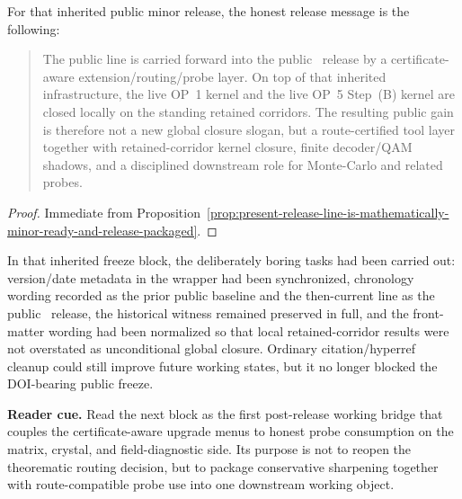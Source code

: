 \begin{corollary}
\label{cor:honest-public-release-message-for-the-present-minor-release}
For that inherited public minor release, the honest release message is the following:
\begin{quote}\small
The public  line is carried forward into the public \docversion\ release by a certificate-aware extension/routing/probe layer. On top of that inherited infrastructure, the live OP~1 kernel and the live OP~5 Step~(B) kernel are closed locally on the standing retained corridors. The resulting public gain is therefore not a new global closure slogan, but a route-certified tool layer together with retained-corridor kernel closure, finite decoder/QAM shadows, and a disciplined downstream role for Monte-Carlo and related probes.
\end{quote}
\end{corollary}

\begin{proof}
Immediate from Proposition~\ref{prop:present-release-line-is-mathematically-minor-ready-and-release-packaged}.
\end{proof}

\begin{remark}
\label{rem:freeze-checklist-completed-for-the-doi-bearing-release}
In that inherited freeze block, the deliberately boring tasks had been carried out: version/date metadata in the wrapper had been synchronized, chronology wording recorded  as the prior public baseline and the then-current line as the public \docversion\ release, the historical witness remained preserved in full, and the front-matter wording had been normalized so that local retained-corridor results were not overstated as unconditional global closure. Ordinary citation/hyperref cleanup could still improve future working states, but it no longer blocked the DOI-bearing public freeze.
\end{remark}


\noindent\textbf{Reader cue.} Read the next block as the first post-release working bridge that couples the certificate-aware upgrade menus to honest probe consumption on the matrix, crystal, and field-diagnostic side. Its purpose is not to reopen the theorematic routing decision, but to package conservative sharpening together with route-compatible probe use into one downstream working object.

